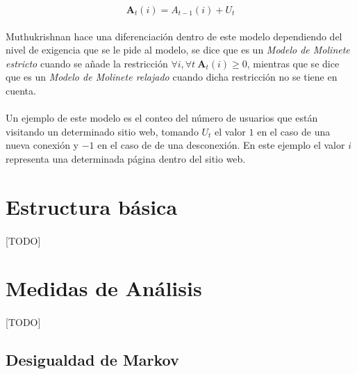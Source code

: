 \documentclass{subfiles}
\begin{document}
        \begin{equation}
        \label{eq:streaming_turnstile}
          \boldsymbol{A}_{t}(i) = {A}_{t-1}(i) + U_{t}
        \end{equation}

        \paragraph{}
        Muthukrishnan \cite{Muthukrishnan:2005:DSA:1166409.1166410} hace una diferenciación dentro de este modelo dependiendo del nivel de exigencia que se le pide al modelo, se dice que es un \emph{Modelo de Molinete estricto} cuando se añade la restricción $\forall i, \forall t \ \boldsymbol{A}_{t}(i) \geq 0$, mientras que se dice que es un \emph{Modelo de Molinete relajado} cuando dicha restricción no se tiene en cuenta.

        \paragraph{}
        Un ejemplo de este modelo es el conteo del número de usuarios que están visitando un determinado sitio web, tomando $U_t$ el valor $1$ en el caso de una nueva conexión y $-1$ en el caso de de una desconexión. En este ejemplo el valor $i$ representa una determinada página dentro del sitio web.

    \section{Estructura básica}
    \label{sec:streaming_structure}

      \paragraph{}
      [TODO]

    \section{Medidas de Análisis}
    \label{sec:streaming_analysis}

      \paragraph{}
      [TODO]

      \subsection{Desigualdad de Markov}
      \label{sec:streaming_markov}
\end{document}
